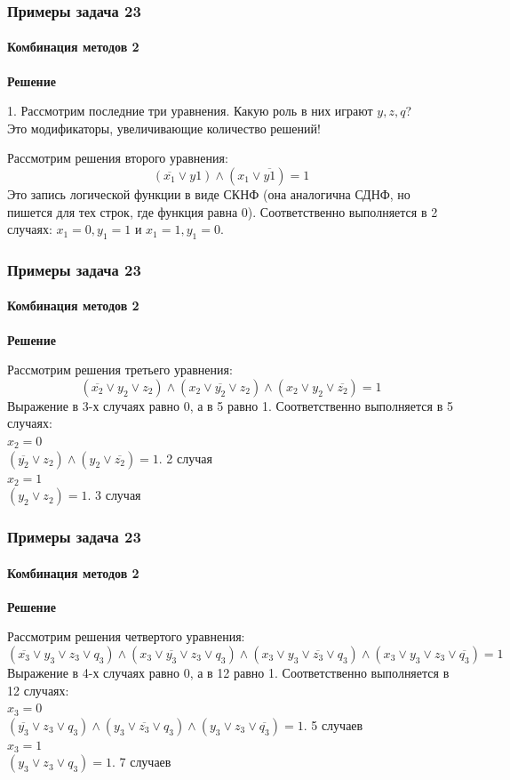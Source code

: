 \begin{frame}[t]
\frametitle{Примеры задача 23}
\framesubtitle{Комбинация методов 2}
\textbf{Решение}

1. Рассмотрим последние три уравнения. Какую роль в них играют $y,z,q$?\\
\pause Это модификаторы, увеличивающие количество решений!

Рассмотрим решения второго уравнения:\\
$$
(\overline{x_1} \vee y1) \wedge (x_1 \vee \overline{y1}) = 1
$$
Это запись логической функции в виде СКНФ (она аналогична СДНФ, но пишется для тех строк, где функция равна 0).
Соответственно выполняется в 2 случаях: $x_1=0,y_1=1$ и $x_1=1,y_1=0$.




\end{frame}

\begin{frame}[t]
\frametitle{Примеры задача 23}
\framesubtitle{Комбинация методов 2}
\textbf{Решение}



Рассмотрим решения третьего уравнения:\\
$$
(\overline{x_2} \vee y_2 \vee z_2) \wedge (x_2 \vee \overline{y_2} \vee z_2) \wedge (x_2 \vee y_2 \vee \overline{z_2}) = 1
$$
Выражение в 3-х случаях равно 0, а в 5 равно 1.
Соответственно выполняется в 5 случаях: \\
$x_2=0 $\\
$(\overline{y_2} \vee z_2) \wedge (y_2 \vee \overline{z_2}) = 1$. 2 случая\\
$x_2=1 $\\
$ (y_2 \vee z_2)  = 1$. 3 случая\\

\end{frame}

\begin{frame}[t]
\frametitle{Примеры задача 23}
\framesubtitle{Комбинация методов 2}
\textbf{Решение}

Рассмотрим решения четвертого уравнения:\\
\scriptsize
$$
(\overline{x_3} \vee y_3\vee z_3 \vee q_3) \wedge (x_3\vee \overline{y_3} \vee z_3\vee q_3) \wedge (x_3\vee y_3\vee \overline{z_3}\vee q_3) \wedge (x_3\vee y_3\vee z_3\vee \overline{q_3}) = 1
$$
\normalsize
Выражение в 4-х случаях равно 0, а в 12 равно 1.
Соответственно выполняется в 12 случаях: \\
$x_3=0 $\\
$(\overline{y_3} \vee z_3\vee q_3) \wedge (y_3\vee \overline{z_3}\vee q_3) \wedge (y_3\vee z_3\vee \overline{q_3}) = 1$. 5 случаев\\
$x_3=1$\\
$(y_3 \vee z_3 \vee q_3)  = 1$. 7 случаев
\end{frame}

